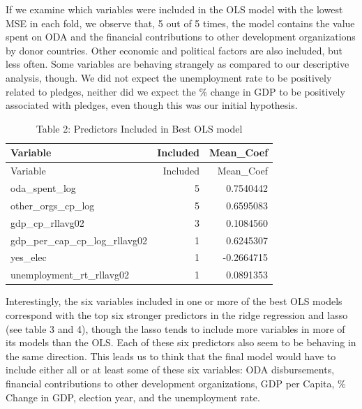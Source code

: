 \documentclass[
]{article}
\begin{document}
If we examine which variables were included in the OLS model with the
lowest MSE in each fold, we observe that, 5 out of 5 times, the model
contains the value spent on ODA and the financial contributions to other
development organizations by donor countries. Other economic and
political factors are also included, but less often. Some variables are
behaving strangely as compared to our descriptive analysis, though. We
did not expect the unemployment rate to be positively related to
pledges, neither did we expect the \% change in GDP to be positively
associated with pledges, even though this was our initial hypothesis.

\begin{longtable}[]{@{}lrr@{}}
\caption{Table 2: Predictors Included in Best OLS model}\tabularnewline
\toprule\noalign{}
Variable & Included & Mean\_Coef \\
\midrule\noalign{}
\endfirsthead
\toprule\noalign{}
Variable & Included & Mean\_Coef \\
\midrule\noalign{}
\endhead
\bottomrule\noalign{}
\endlastfoot
oda\_spent\_log & 5 & 0.7540442 \\
other\_orgs\_cp\_log & 5 & 0.6595083 \\
gdp\_cp\_rllavg02 & 3 & 0.1084560 \\
gdp\_per\_cap\_cp\_log\_rllavg02 & 1 & 0.6245307 \\
yes\_elec & 1 & -0.2664715 \\
unemployment\_rt\_rllavg02 & 1 & 0.0891353 \\
\end{longtable}

Interestingly, the six variables included in one or more of the best OLS
models correspond with the top six stronger predictors in the ridge
regression and lasso (see table 3 and 4), though the lasso tends to
include more variables in more of its models than the OLS. Each of these
six predictors also seem to be behaving in the same direction. This
leads us to think that the final model would have to include either all
or at least some of these six variables: ODA disbursements, financial
contributions to other development organizations, GDP per Capita, \%
Change in GDP, election year, and the unemployment rate.
\end{document}
